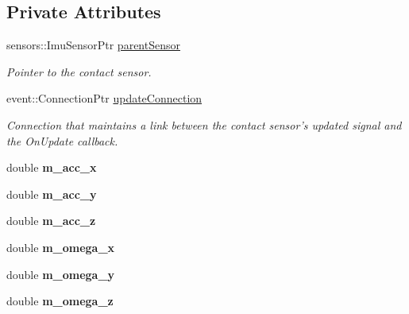 \subsection*{\-Private \-Attributes}
\begin{DoxyCompactItemize}
\item 
\hypertarget{classgazebo_1_1GazeboIMUPlugin_acbf05202baa4372075fd2b92a755e6f4}{sensors\-::\-Imu\-Sensor\-Ptr \hyperlink{classgazebo_1_1GazeboIMUPlugin_acbf05202baa4372075fd2b92a755e6f4}{parent\-Sensor}}\label{classgazebo_1_1GazeboIMUPlugin_acbf05202baa4372075fd2b92a755e6f4}

\begin{DoxyCompactList}\small\item\em \-Pointer to the contact sensor. \end{DoxyCompactList}\item 
\hypertarget{classgazebo_1_1GazeboIMUPlugin_ab641d34696082d04895c37bd3a04a4fc}{event\-::\-Connection\-Ptr \hyperlink{classgazebo_1_1GazeboIMUPlugin_ab641d34696082d04895c37bd3a04a4fc}{update\-Connection}}\label{classgazebo_1_1GazeboIMUPlugin_ab641d34696082d04895c37bd3a04a4fc}

\begin{DoxyCompactList}\small\item\em \-Connection that maintains a link between the contact sensor's updated signal and the \-On\-Update callback. \end{DoxyCompactList}\item 
\hypertarget{classgazebo_1_1GazeboIMUPlugin_a353321c42baf09fd6b4f542ef92c4b2c}{double {\bfseries m\-\_\-acc\-\_\-x}}\label{classgazebo_1_1GazeboIMUPlugin_a353321c42baf09fd6b4f542ef92c4b2c}

\item 
\hypertarget{classgazebo_1_1GazeboIMUPlugin_a9209423fc4dc45c2db7d96a239b78539}{double {\bfseries m\-\_\-acc\-\_\-y}}\label{classgazebo_1_1GazeboIMUPlugin_a9209423fc4dc45c2db7d96a239b78539}

\item 
\hypertarget{classgazebo_1_1GazeboIMUPlugin_a3f1430576aae2c8790bd444f8a7696a7}{double {\bfseries m\-\_\-acc\-\_\-z}}\label{classgazebo_1_1GazeboIMUPlugin_a3f1430576aae2c8790bd444f8a7696a7}

\item 
\hypertarget{classgazebo_1_1GazeboIMUPlugin_a1ab7b15c4e59142060de61de883367c8}{double {\bfseries m\-\_\-omega\-\_\-x}}\label{classgazebo_1_1GazeboIMUPlugin_a1ab7b15c4e59142060de61de883367c8}

\item 
\hypertarget{classgazebo_1_1GazeboIMUPlugin_aabecd1fa883d375dee9e366ce62ee910}{double {\bfseries m\-\_\-omega\-\_\-y}}\label{classgazebo_1_1GazeboIMUPlugin_aabecd1fa883d375dee9e366ce62ee910}

\item 
\hypertarget{classgazebo_1_1GazeboIMUPlugin_a172a5a0c84e0daacb2034d6aad0fceee}{double {\bfseries m\-\_\-omega\-\_\-z}}\label{classgazebo_1_1GazeboIMUPlugin_a172a5a0c84e0daacb2034d6aad0fceee}

\end{DoxyCompactItemize}


